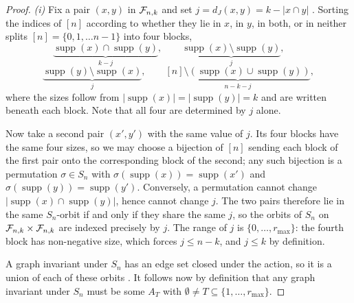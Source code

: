 \begin{proof}

\emph{(i)} Fix a pair $(x,y)$ in $\mathcal{F}_{n,k}$ and set $j=d_J(x,y)=k-|x\cap y|$ . Sorting the indices of $[n]$ according to whether they lie in $x$, in $y$, in both, or in neither splits $[n] = \{0,1,\dots n-1\}$ into four blocks,
\begin{equation*}
\underbrace{\operatorname{supp}(x)\cap \operatorname{supp}(y)}_{k-j},\qquad \underbrace{\operatorname{supp}(x) \setminus \operatorname{supp}(y)}_{j},\qquad
\end{equation*}
\begin{equation*}
\underbrace{\operatorname{supp}(y) \setminus \operatorname{supp}(x)}_{j},\qquad \underbrace{[n]\setminus(\operatorname{supp}(x) \cup \operatorname{supp}(y))}_{n-k-j},
\end{equation*}
where the sizes follow from $|\operatorname{supp}(x)|=|\operatorname{supp}(y)|=k$ and are written beneath each block. Note that all four are determined by $j$ alone.

Now take a second pair $(x',y')$ with the same value of $j$. Its four blocks have the same four sizes, so we may choose a bijection of $[n]$ sending each block of the first pair onto the corresponding block of the second; any such bijection is a permutation $\sigma\in S_n$ with $\sigma(\operatorname{supp}(x))=\operatorname{supp}(x')$ and $\sigma(\operatorname{supp}(y))=\operatorname{supp}(y')$. Conversely, a permutation cannot change $|\operatorname{supp}(x) \cap \operatorname{supp}(y)|$, hence cannot change $j$. The two pairs therefore lie in the same $S_n$-orbit if and only if they share the same $j$, so the orbits of $S_n$ on $\mathcal{F}_{n,k}\times\mathcal{F}_{n,k}$ are indexed precisely by $j$. The range of $j$ is $\{0,\dots,r_{\max}\}$: the fourth block has non-negative size, which forces $j\le n-k$, and $j\le k$ by definition.

A graph invariant under $S_n$ has an edge set closed under the action, so it is a union of each of these orbits . It follows now by definition that any graph invariant under $S_n$ must be some $A_T$ with $\emptyset\neq T\subseteq\{1,\dots,r_{\max}\}$.


\end{proof}
